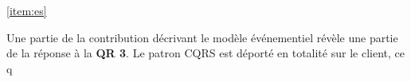 \ref{item:es} 
%

Une partie de la contribution décrivant le modèle événementiel révèle une partie de 
la réponse à la \textbf{QR 3}.
Le patron \gls{CQRS} est déporté en totalité sur le client, ce q

%
%
%
%
%
%
%
%
%
%
%
